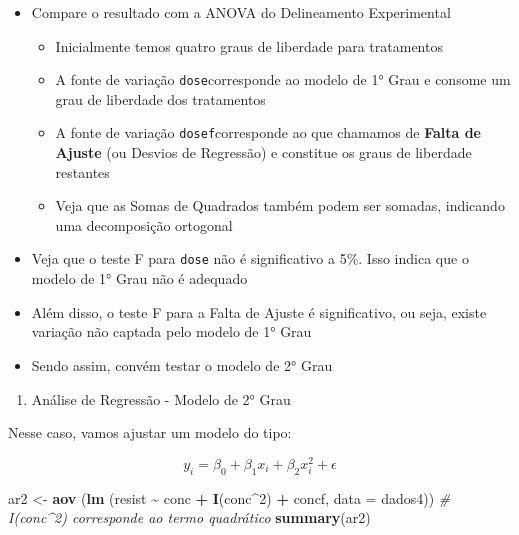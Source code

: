 \documentclass[
]{book}
\newenvironment{Shaded}{\begin{snugshade}}{\end{snugshade}}
\newcommand{\AttributeTok}[1]{\textcolor[rgb]{0.13,0.29,0.53}{#1}}
\newcommand{\CommentTok}[1]{\textcolor[rgb]{0.56,0.35,0.01}{\textit{#1}}}
\newcommand{\DecValTok}[1]{\textcolor[rgb]{0.00,0.00,0.81}{#1}}
\newcommand{\FunctionTok}[1]{\textcolor[rgb]{0.13,0.29,0.53}{\textbf{#1}}}
\newcommand{\NormalTok}[1]{#1}
\newcommand{\OtherTok}[1]{\textcolor[rgb]{0.56,0.35,0.01}{#1}}
\newcommand{\SpecialCharTok}[1]{\textcolor[rgb]{0.81,0.36,0.00}{\textbf{#1}}}
\providecommand{\tightlist}{%
  \setlength{\itemsep}{0pt}\setlength{\parskip}{0pt}}
\begin{document}
\begin{itemize}
\tightlist
\item
  Compare o resultado com a ANOVA do Delineamento Experimental

  \begin{itemize}
  \tightlist
  \item
    Inicialmente temos quatro graus de liberdade para tratamentos
  \item
    A fonte de variação \texttt{dose}corresponde ao modelo de 1° Grau e consome um grau de liberdade dos tratamentos
  \item
    A fonte de variação \texttt{dosef}corresponde ao que chamamos de \textbf{Falta de Ajuste} (ou Desvios de Regressão) e constitue os graus de liberdade restantes
  \item
    Veja que as Somas de Quadrados também podem ser somadas, indicando uma decomposição ortogonal
  \end{itemize}
\item
  Veja que o teste F para \texttt{dose} não é significativo a 5\%. Isso indica que o modelo de 1° Grau não é adequado
\item
  Além disso, o teste F para a Falta de Ajuste é significativo, ou seja, existe variação não captada pelo modelo de 1° Grau
\item
  Sendo assim, convém testar o modelo de 2° Grau
\end{itemize}

\begin{enumerate}
\def\labelenumi{\arabic{enumi}.}
\setcounter{enumi}{4}
\tightlist
\item
  Análise de Regressão - Modelo de 2° Grau
\end{enumerate}

Nesse caso, vamos ajustar um modelo do tipo:

\[y_{i}=\beta _{0}+\beta _{1}x_{i}+\beta _{2}x_{i}^2+\epsilon\]

\begin{Shaded}
\begin{Highlighting}[]
\NormalTok{ar2 }\OtherTok{\textless{}{-}} \FunctionTok{aov}\NormalTok{ (}\FunctionTok{lm}\NormalTok{ (resist }\SpecialCharTok{\textasciitilde{}}\NormalTok{ conc }\SpecialCharTok{+} \FunctionTok{I}\NormalTok{(conc}\SpecialCharTok{\^{}}\DecValTok{2}\NormalTok{) }\SpecialCharTok{+}\NormalTok{ concf, }\AttributeTok{data =}\NormalTok{ dados4)) }\CommentTok{\# I(conc\^{}2) corresponde ao termo quadrático}
\FunctionTok{summary}\NormalTok{(ar2)}
\end{Highlighting}
\end{Shaded}
\end{document}
